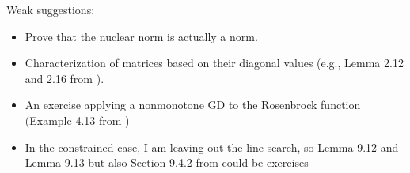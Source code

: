 \documentclass[10pt,a4paper]{article}
\begin{document}
Weak suggestions:
\begin{itemize}
    \item Prove that the nuclear norm is actually a norm.
    \item Characterization of matrices based on their diagonal values (e.g., Lemma 2.12 and 2.16 from \cite{beck14a}).  \checkmark
    \item An exercise applying a nonmonotone GD to the Rosenbrock function (Example 4.13 from \cite{beck14a})
    \item In the constrained case, I am leaving out the line search, so Lemma 9.12 and Lemma 9.13 but also Section 9.4.2 from \cite{beck14a} could be exercises 
\end{itemize}



\end{document}
